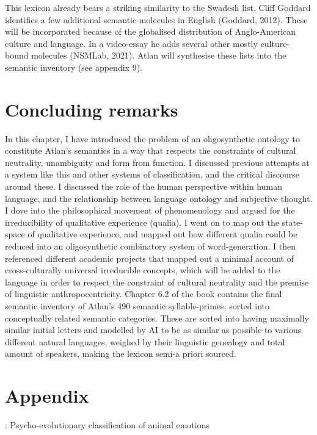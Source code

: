 This lexicon already bears a striking similarity to the Swadesh list. Cliff Goddard identifies a few additional semantic molecules in English (Goddard, 2012). These will be incorporated because of the globalised distribution of Anglo-American culture and language. In a video-essay he adds several other mostly culture-bound molecules (NSMLab, 2021). Atlan will synthesise these lists into the semantic inventory (see appendix 9).  

 

\section{Concluding remarks}

In this chapter, I have introduced the problem of an oligosynthetic ontology to constitute Atlan’s semantics in a way that respects the constraints of cultural neutrality, unambiguity and form from function. I discussed previous attempts at a system like this and other systems of classification, and the critical discourse around these. I discussed the role of the human perspective within human language, and the relationship between language ontology and subjective thought. I dove into the philosophical movement of phenomenology and argued for the irreducibility of qualitative experience (qualia). I went on to map out the state-space of qualitative experience, and mapped out how different qualia could be reduced into an oligosynthetic combinatory system of word-generation. I then referenced different academic projects that mapped out a minimal account of cross-culturally universal irreducible concepts, which will be added to the language in order to respect the constraint of cultural neutrality and the premise of linguistic anthropocentricity. Chapter 6.2 of the book contains the final semantic inventory of Atlan’s 490 semantic syllable-primes, sorted into conceptually related semantic categories. These are sorted into having maximally similar initial letters and modelled by AI to be as similar as possible to various different natural languages, weighed by their linguistic genealogy and total amount of speakers, making the lexicon semi-a priori sourced. 


\section{Appendix}



: Psycho-evolutionary classification of animal emotions 

